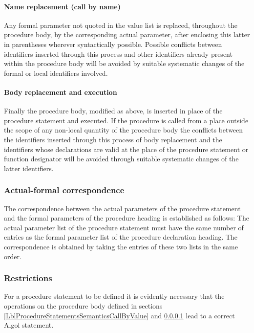 \documentclass[a4paper,11pt]{article}
\begin{document}
\paragraph{Name replacement (call by name)}
\label{LblProcedureStatementsSemanticsCallByName}

Any formal parameter not quoted in the value list is replaced,
throughout the procedure body, by the corresponding actual parameter,
after enclosing this latter in parentheses wherever syntactically
possible.  Possible conflicts between identifiers inserted through
this process and other identifiers already present within the
procedure body will be avoided by suitable systematic changes of the
formal or local identifiers involved.

\paragraph{Body replacement and execution}

Finally the procedure body, modified as above, is inserted in place of
the procedure statement and executed.  If the procedure is called from
a place outside the scope of any non-local quantity of the procedure
body the conflicts between the identifiers inserted through this
process of body replacement and the identifiers whose declarations are
valid at the place of the procedure statement or function designator
will be avoided through suitable systematic changes of the latter
identifiers.

\subsubsection{Actual-formal correspondence}

The correspondence between the actual parameters of the procedure
statement and the formal parameters of the procedure heading is
established as follows: The actual parameter list of the procedure
statement must have the same number of entries as the formal parameter
list of the procedure declaration heading.  The correspondence is
obtained by taking the entries of these two lists in the same order.

\subsubsection{Restrictions}
\label{LblProcedureStatementsRestrictions}

For a procedure statement to be defined it is evidently necessary that
the operations on the procedure body defined in sections
\ref{LblProcedureStatementsSemanticsCallByValue} and
\ref{LblProcedureStatementsSemanticsCallByName} lead to a correct
Algol statement.
\end{document}
